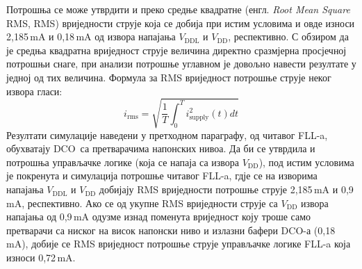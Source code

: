 \documentclass[master]{finthesis}
\makeatletter
\newcommand*{\engl}[2][\@empty]{%
    \edef\theacronym{#1}%
    (енгл. \foreignlanguage{english}{\emph{#2}%
    \ifx\theacronym\@empty \else , #1\fi})%
}
\def \FLL  {FLL} %
\def \DCO  {DCO} %
\makeatother
\begin{document}
Потрошња се може утврдити и преко средње квадратне \engl[RMS]{Root Mean Square} вриједности струје која се добија при истим условима и овде износи 2,185\,mA и 0,18\,mA од извора напајања $V_\text{DDL}$ и $V_\text{DD}$, респективно. С обзиром да је средња квадратна вриједност струје величина директно сразмјерна просјечној потрошњи снаге, при анализи потрошње углавном је довољно навести резултате у једној од тих величина. Формула за RMS вриједност потрошње струје неког извора гласи:
\begin{equation}
	\label{eq:impl:dco_pwr:rms_i}
	i_\text{rms} = \sqrt{\frac{1}{T}\int_{0}^{T}i_\text{supply}^{2}(t)dt}
\end{equation}
Резултати симулације наведени у претходном параграфу, од читавог \FLL-a, обухватају \DCO\ са претварачима напонских нивоа. Да би се утврдила и потрошња управљачке логике (која се напаја са извора $V_\text{DD}$), под истим условима је покренута и симулација потрошње читавог \FLL-a, гдје се на изворима напајања $V_\text{DDL}$ и $V_\text{DD}$ добијају RMS вриједности потрошње струје 2,185\,mA и 0,9\,mA, респективно. Ако се од укупне RMS вриједности струје са $V_\text{DD}$ извора напајања од 0,9\,mA одузме изнад поменута вриједност коју троше само претварачи са ниског на висок напонски ниво и излазни бафери \DCO-а (0,18\,mA), добије се RMS вриједност потрошње струје управљачке логике \FLL-a која износи 0,72\,mA.
\end{document}
